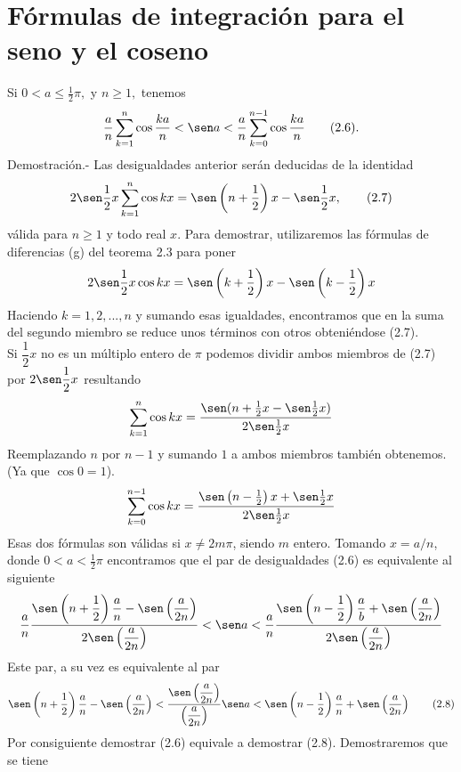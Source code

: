 \begin{teo}
\begin{enumerate}[\bfseries (a)]
    \end{enumerate}
\end{teo}


\section{Fórmulas de integración para el seno y el coseno}

\begin{teo} Si $0<a\leq \frac{1}{2}\pi,$ y $n\geq 1,$ tenemos $$\dfrac{a}{n}\sum_{k=1}^n \cos \dfrac{ka}{n}<\sen a < \dfrac{a}{n}\sum_{k=0}^{n-1} \cos \dfrac{ka}{n} \qquad \mbox{(2.6)}.$$
    Demostración.-\; Las desigualdades anterior serán deducidas de la identidad $$2\sen \dfrac{1}{2} x \sum_{k=1}^n \cos kx = \sen\left(n+\dfrac{1}{2}\right)x-\sen \dfrac{1}{2}x, \qquad \mbox{(2.7)}$$
    válida para $n\geq 1$ y todo real $x$. Para demostrar, utilizaremos las fórmulas de diferencias (g) del teorema 2.3 para poner $$2\sen\dfrac{1}{2}x\cos kx = \sen \left(k+\dfrac{1}{2}\right)x - \sen\left(k-\dfrac{1}{2}\right)x$$
    Haciendo $k=1,2,...,n$ y sumando esas igualdades, encontramos que en la suma del segundo miembro se reduce unos términos con otros obteniéndose (2.7).\\
    Si $\dfrac{1}{2}x$ no es un múltiplo entero de $\pi$ podemos dividir ambos miembros de (2.7) por $2\sen \dfrac{1}{2}x$ resultando $$\sum_{k=1}^n \cos kx = \dfrac{\sen(n+\frac{1}{2}x-\sen \frac{1}{2} x)}{2\sen \frac{1}{2}x}$$ 
    Reemplazando $n$ por $n-1$ y sumando $1$ a ambos miembros también obtenemos. (Ya que $\cos 0 = 1$).
    $$\sum_{k=0}^{n-1} \cos kx = \dfrac{\sen\left(n-\frac{1}{2}\right)x + \sen\frac{1}{2}x}{2\sen\frac{1}{2}x}$$
    Esas dos fórmulas son válidas si $x\neq2m\pi$, siendo $m$ entero. Tomando $x=a/n$, donde $0<a<\frac{1}{2}\pi$ encontramos que el par de desigualdades (2.6) es equivalente al siguiente 
    $$\dfrac{a}{n}\dfrac{\sen\left(n+\dfrac{1}{2}\right)\dfrac{a}{n} - \sen \left(\dfrac{a}{2n}\right)}{2\sen\left(\dfrac{a}{2n}\right)} < \sen a < \dfrac{a}{n}\dfrac{\sen\left(n-\dfrac{1}{2}\right)\dfrac{a}{b}+\sen\left(\dfrac{a}{2n}\right)}{2\sen\left(\dfrac{a}{2n}\right)}$$
    Este par, a su vez es equivalente al par
    $$\sen\left(n+\dfrac{1}{2}\right)\dfrac{a}{n}-\sen\left(\dfrac{a}{2n}\right) < \dfrac{\sen\left(\dfrac{a}{2n}\right)}{\left(\dfrac{a}{2n}\right)} \sen a < \sen\left(n-\dfrac{1}{2}\right)\dfrac{a}{n}+\sen\left(\dfrac{a}{2n}\right) \qquad \mbox{(2.8)}$$
    Por consiguiente demostrar (2.6) equivale a demostrar (2.8). Demostraremos que se tiene 

\end{teo}
